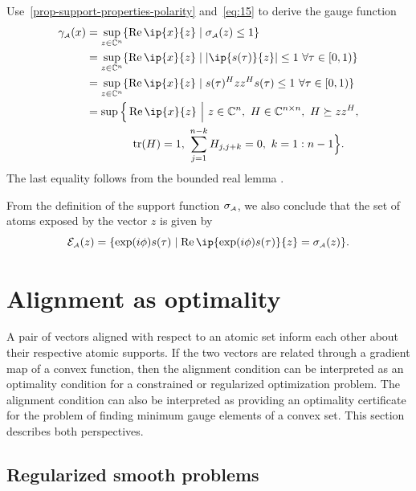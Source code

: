 \begin{example}
  Use~\autoref{prop-support-properties-polarity} and~\eqref{eq:15} to derive the
  gauge function
  \begin{align*}
    \gauge\As(x)
      &= \sup_{z\in\Complex^n}\{\re\ip{x}{z} \mid \sigma\As(z) \leq 1\}
    \\&= \sup_{z\in\Complex^n}\{\re\ip{x}{z} \mid |\ip{s(\tau)}{z}| \leq 1\ \forall \tau\in[0,1)\}
    \\&= \sup_{z\in\Complex^n}\{\re\ip{x}{z} \mid s(\tau)^Hzz^Hs(\tau) \leq 1\ \forall \tau\in[0,1)\}
    \\&= \sup\Big\{\re\ip{x}{z} \ \Big\vert\  z\in\Complex^n,\ H \in \Complex^{n\times n},\ H \succeq zz^H,
    \\ &\qquad\qquad \trace(H) = 1,\ \sum_{j = 1}^{n-k}H_{j, j+k} = 0,\ k = 1:n-1\Big\}.
  \end{align*}
  The last equality follows from the bounded real lemma \cite[Lemma
  4.23]{dumitrescu2007positive}.

  From the definition of the support function $\sigma_{\scriptscriptstyle\mathcal{A}}$, we also
  conclude that the set of atoms exposed by the vector $z$ is given by
  \[\Escr\As(z) = \{\exp(i\phi)s(\tau) \mid \re\ip{\exp(i\phi)s(\tau)}{z} = \sigma\As(z)\}.\]
\end{example}


\section{Alignment as optimality} \label{sec:manifestations}

A pair of vectors aligned with respect to an atomic set inform each other about
their respective atomic supports. If the two vectors are related through a
gradient map of a convex function, then the alignment condition can be
interpreted as an optimality condition for a constrained or regularized
optimization problem. The alignment condition can also be interpreted as
providing an optimality certificate for the problem of finding minimum gauge
elements of a convex set. This section describes both perspectives.

\subsection{Regularized smooth problems}

